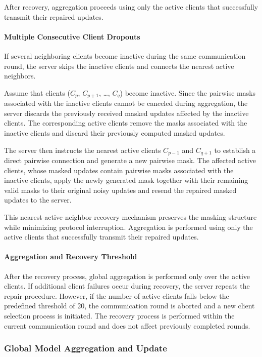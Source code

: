 \documentclass[a4paper,fleqn]{cas-dc}
\begin{document}
After recovery, aggregation proceeds using only the active clients that successfully transmit their repaired updates.

\paragraph{Multiple Consecutive Client Dropouts}
If several neighboring clients become inactive during the same communication round, the server skips the inactive clients and connects the nearest active neighbors.

Assume that clients ($C_{p}$, $C_{p+1}$, \ldots, $C_{q}$) become inactive. Since the pairwise masks associated with the inactive clients cannot be canceled during aggregation, the server discards the previously received masked updates affected by the inactive clients. The corresponding active clients remove the masks associated with the inactive clients and discard their previously computed masked updates.

The server then instructs the nearest active clients $C_{p-1}$ and $C_{q+1}$ to establish a direct pairwise connection and generate a new pairwise mask. The affected active clients, whose masked updates contain pairwise masks associated with the inactive clients, apply the newly generated mask together with their remaining valid masks to their original noisy updates and resend the repaired masked updates to the server.

This nearest-active-neighbor recovery mechanism preserves the masking structure while minimizing protocol interruption. Aggregation is performed using only the active clients that successfully transmit their repaired updates.

\paragraph{Aggregation and Recovery Threshold}
After the recovery process, global aggregation is performed only over the active clients. If additional client failures occur during recovery, the server repeats the repair procedure. However, if the number of active clients falls below the predefined threshold of 20, the communication round is aborted and a new client selection process is initiated. The recovery process is performed within the current communication round and does not affect previously completed rounds.

\subsubsection{Global Model Aggregation and Update}
\label{sec:4.2.6}
\end{document}
